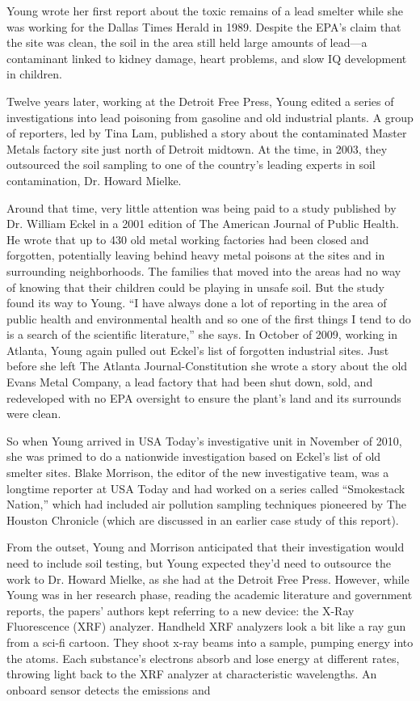 Young wrote her first report about the toxic remains of a lead smelter while
she was working for the Dallas Times Herald in 1989. Despite the EPA's
claim that the site was clean, the soil in the area still held large amounts of
lead—a contaminant linked to kidney damage, heart problems, and slow IQ
development in children.

Twelve years later, working at the Detroit Free Press, Young edited a series of
investigations into lead poisoning from gasoline and old industrial plants. A
group of reporters, led by Tina Lam, published a story about the contaminated
Master Metals factory site just north of Detroit midtown. At the time,
in 2003, they outsourced the soil sampling to one of the country's leading
experts in soil contamination, Dr. Howard Mielke.

Around that time, very little attention was being paid to a study published
by Dr. William Eckel in a 2001 edition of The American Journal of Public
Health. He wrote that up to 430 old metal working factories had been closed
and forgotten, potentially leaving behind heavy metal poisons at the sites
and in surrounding neighborhoods. The families that moved into the areas
had no way of knowing that their children could be playing in unsafe soil.
But the study found its way to Young. ``I have always done a lot of reporting
in the area of public health and environmental health and so one of the first
things I tend to do is a search of the scientific literature,'' she says.
In October of 2009, working in Atlanta, Young again pulled out Eckel's list
of forgotten industrial sites. Just before she left The Atlanta Journal-Constitution
she wrote a story about the old Evans Metal Company, a lead factory
that had been shut down, sold, and redeveloped with no EPA oversight to
ensure the plant's land and its surrounds were clean.

So when Young arrived in USA Today's investigative unit in November of
2010, she was primed to do a nationwide investigation based on Eckel's
list of old smelter sites. Blake Morrison, the editor of the new investigative
team, was a longtime reporter at USA Today and had worked on a series
called ``Smokestack Nation,'' which had included air pollution sampling
techniques pioneered by The Houston Chronicle (which are discussed in an
earlier case study of this report).

From the outset, Young and Morrison anticipated that their investigation
would need to include soil testing, but Young expected they'd need to outsource
the work to Dr. Howard Mielke, as she had at the Detroit Free Press.
However, while Young was in her research phase, reading the academic literature
and government reports, the papers' authors kept referring to a new
device: the X-Ray Fluorescence (XRF) analyzer. Handheld XRF analyzers
look a bit like a ray gun from a sci-fi cartoon. They shoot x-ray beams into a
sample, pumping energy into the atoms. Each substance's electrons absorb
and lose energy at different rates, throwing light back to the XRF analyzer
at characteristic wavelengths. An onboard sensor detects the emissions and

